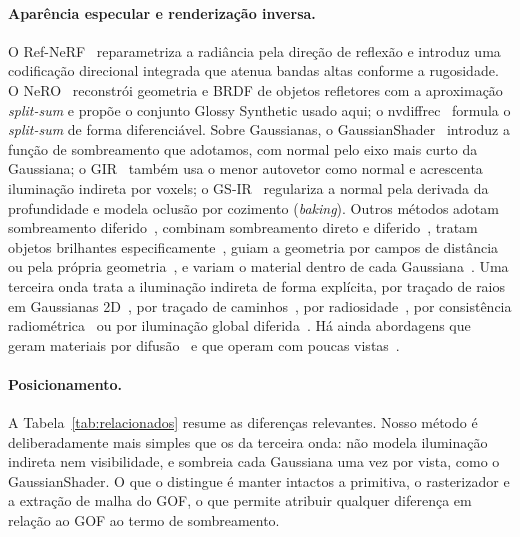 \documentclass[12pt]{article}
\begin{document}
\paragraph{Aparência especular e renderização inversa.}
O Ref-NeRF~\cite{verbin2022refnerf} reparametriza a radiância pela direção de reflexão e introduz uma codificação direcional integrada que atenua bandas altas conforme a rugosidade.
O NeRO~\cite{liu2023nero} reconstrói geometria e BRDF de objetos refletores com a aproximação \emph{split-sum} e propõe o conjunto Glossy Synthetic usado aqui; o nvdiffrec~\cite{munkberg2022nvdiffrec} formula o \emph{split-sum} de forma diferenciável.
Sobre Gaussianas, o GaussianShader~\cite{jiang2024gaussianshader} introduz a função de sombreamento que adotamos, com normal pelo eixo mais curto da Gaussiana; o GIR~\cite{shi2025gir} também usa o menor autovetor como normal e acrescenta iluminação indireta por voxels; o GS-IR~\cite{liang2024gsir} regulariza a normal pela derivada da profundidade e modela oclusão por cozimento (\emph{baking}).
Outros métodos adotam sombreamento diferido~\cite{wu2025deferredgs,yao2025refgaussian}, combinam sombreamento direto e diferido~\cite{liang2025gusir,zhou2025rtrgs}, tratam objetos brilhantes especificamente~\cite{lai2025glossygs,yang2025gogs}, guiam a geometria por campos de distância~\cite{zhu2025gsror2,zhu2025dsdf} ou pela própria geometria~\cite{ye2025geosplatting}, e variam o material dentro de cada Gaussiana~\cite{sun2025svgir}.
Uma terceira onda trata a iluminação indireta de forma explícita, por traçado de raios em Gaussianas 2D~\cite{gu2025irgs,gu2026irgsext}, por traçado de caminhos~\cite{zhu2026ptirgs}, por radiosidade~\cite{jiang2025radiosity}, por consistência radiométrica~\cite{han2026radiometric} ou por iluminação global diferida~\cite{chen2024gigs}.
Há ainda abordagens que geram materiais por difusão~\cite{xu2026gspi} e que operam com poucas vistas~\cite{noras2025gains}.

\paragraph{Posicionamento.}
A Tabela~\ref{tab:relacionados} resume as diferenças relevantes.
Nosso método é deliberadamente mais simples que os da terceira onda: não modela iluminação indireta nem visibilidade, e sombreia cada Gaussiana uma vez por vista, como o GaussianShader.
O que o distingue é manter intactos a primitiva, o rasterizador e a extração de malha do GOF, o que permite atribuir qualquer diferença em relação ao GOF ao termo de sombreamento.
\end{document}
